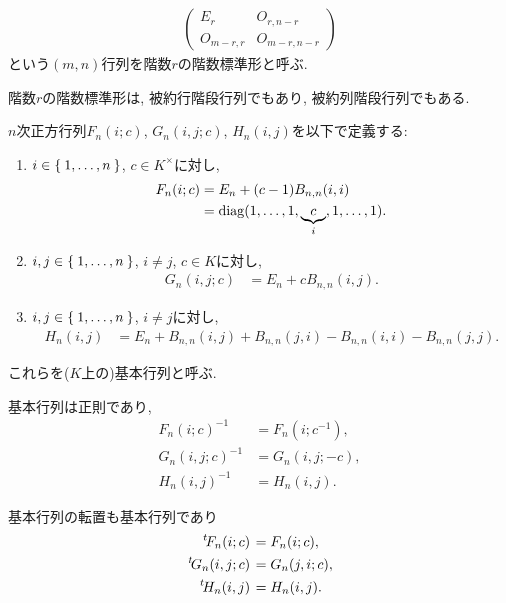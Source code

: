 \begin{definition}
  \begin{align*}
    \left(
    \begin{array}{c|c}
      E_r&O_{r,n-r}\\
      O_{m-r,r}&O_{m-r,n-r}
    \end{array}
    \right)
  \end{align*}
  という$(m,n)$行列を階数$r$の階数標準形と呼ぶ.
\end{definition}
\begin{remark}
  階数$r$の階数標準形は,
  被約行階段行列でもあり,
  被約列階段行列でもある.
\end{remark}

\begin{definition}
  $n$次正方行列$F_n(i;c)$, $G_n(i,j;c)$, $H_n(i,j)$を以下で定義する:
  \begin{enumerate}
    \item $i\in\Set{1,\ldots,n}$, $c\in K^\times$に対し,
      \begin{align*}
        F_n(i;c)&=E_n+(c-1)B_{n,n}(i,i)\\
        &=\operatorname{diag}(1,\ldots,1,\underbrace{c}_{i},1,\ldots,1).
      \end{align*}
    \item $i,j\in\Set{1,\ldots,n}$, $i\neq j$, $c\in K$に対し,
      \begin{align*}
        G_n(i,j;c)&=E_n+cB_{n,n}(i,j).
      \end{align*}
    \item $i,j\in\Set{1,\ldots,n}$, $i\neq j$に対し,
      \begin{align*}
        H_n(i,j)&=E_n+B_{n,n}(i,j)+B_{n,n}(j,i)-B_{n,n}(i,i)-B_{n,n}(j,j).
      \end{align*}
  \end{enumerate}
  これらを($K$上の)基本行列と呼ぶ.
\end{definition}

\begin{prop}
  基本行列は正則であり,
  \begin{align*}
    F_n(i;c)^{-1}&=F_n(i;c^{-1}),\\
    G_n(i,j;c)^{-1}&=G_n(i,j;-c),\\
    H_n(i,j)^{-1}&=H_n(i,j).
  \end{align*}
\end{prop}

\begin{prop}
  基本行列の転置も基本行列であり
  \begin{align*}
    \left.^{t}\!F_n(i;c)\right.&=F_n(i;c),\\
    \left.^{t}\!G_n(i,j;c)\right.&=G_n(j,i;c),\\
    \left.^{t}\!H_n(i,j)\right.&=H_n(i,j).
  \end{align*}
\end{prop}

